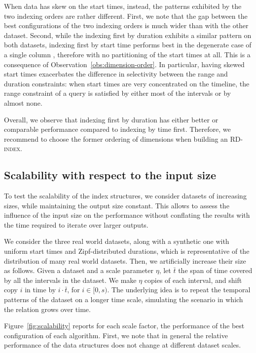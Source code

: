 \documentclass[sigconf,nonacm,anonymous]{acmart}
\theoremstyle{definition}
\newcommand{\algo}[1]{\textsc{#1}}
\newcommand{\ours}{\algo{RD-index}\xspace}
\begin{document}
When data has skew on the start times, instead, the patterns exhibited
by the two indexing orders are rather different.
First, we note that the gap between the best configurations of the two indexing orders is
much wider than with the other dataset.
Second, while the indexing first by duration exhibits a similar pattern on both datasets,
indexing first by start time performs best in the degenerate case of a single column , 
therefore with no partitioning of the start times at all.
This is a consequence of Observation~\ref{obs:dimension-order}. In particular,
having skewed start times exacerbates
the difference in selectivity between the range and duration constraints: when
start times are very concentrated on the timeline, the range constraint of a query is satisfied by either most of the intervals or by almost none.

Overall, we observe that indexing first by duration has either better or comparable performance compared to indexing by time first.
Therefore, we recommend to choose the former ordering of dimensions when building an \ours.

\subsection{Scalability with respect to the input size}
\label{sec:scalability}


To test the scalability of the index structures, we consider datasets of increasing sizes, while maintaining the output size constant. 
This allows to assess the influence of the input size on the performance without conflating the results with the time required to iterate over larger outputs.

We consider the three real world datasets, along with a synthetic one with uniform start times and Zipf-distributed durations, which is representative of the distribution of many real world datasets.
Then, we artificially increase their size as follows.
Given a dataset and a scale parameter $\eta$, let $\bar{t}$ the span of time covered by all the intervals in the dataset.
We make $\eta$ copies of each interval, and shift copy $i$ in time by $i\cdot \bar{t}$, for $i\in[0, s)$.
The underlying idea is to repeat the temporal patterns of the dataset on a longer time scale, simulating the scenario in which the relation grows over time.

Figure~\ref{fig:scalability} reports for each scale factor, the performance of the best configuration of each algorithm.
First, we note that in general the relative performance of the data structures does not change at different dataset scales.
\end{document}

